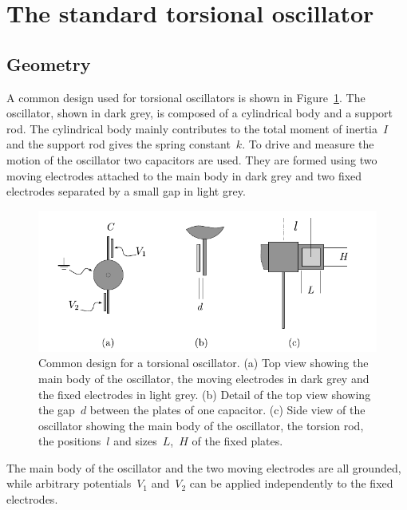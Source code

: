 



\section{The standard torsional oscillator}

\subsection{Geometry}
\label{sec.standard}
A common design used for torsional oscillators is shown in Figure~\ref{fig.StandardDesign}.
The oscillator, shown in dark grey, is composed of a cylindrical body and a support rod. The cylindrical body mainly contributes to the total moment of inertia~$I$ and the support rod gives the spring constant~$k$. To drive and measure the motion of the oscillator two capacitors are used. They are formed using two moving electrodes attached to the main body in dark grey and two fixed electrodes separated by a small gap in light grey.
\begin{figure}[htb]
	\captionsetup{width=.8\linewidth}
	\centering
	\includegraphics[width=12cm]{StandardDesign}
	\caption{ \small Common design for a torsional oscillator.
		(a) Top view showing the main body of the oscillator, the moving electrodes in dark grey and the fixed electrodes in light grey. (b) Detail of the top view showing the gap~$d$ between the plates of one capacitor. (c) Side view of the oscillator showing the main body of the oscillator, the torsion rod, the positions~$l$ and sizes~$L$,~$H$ of the fixed plates.}
	\label{fig.StandardDesign}
\end{figure}
The main body of the oscillator and the two moving electrodes are all grounded, while arbitrary potentials~$V_1$ and~$V_2$ can be applied independently to the fixed electrodes.

